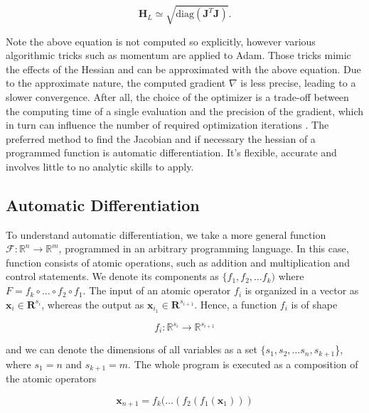 \documentclass{article}
\begin{document}
\begin{equation}
    \mathbf{H}_L \simeq \sqrt{\text{diag}(\mathbf{J}^T\mathbf{J})}.
\end{equation}

Note the above equation is not computed so explicitly, however various algorithmic tricks such as momentum are applied to Adam. Those tricks mimic the effects of the Hessian and can be approximated with the above equation. Due to the approximate nature, the computed gradient $\nabla$ is less precise, leading to a slower convergence. After all, the choice of the optimizer is a trade-off between the computing time of a single evaluation and the precision of the gradient, which in turn can influence the number of required optimization iterations \citep{bottou2007tradeoffs}. The preferred method to find the Jacobian and if necessary the hessian of a programmed function is automatic differentiation. It's flexible, accurate and involves little to no analytic skills to apply.

\subsection{Automatic Differentiation}
\label{ad}

To understand automatic differentiation, we take a more general function $\mathcal{F} \colon \mathbb{R}^n \rightarrow \mathbb{R}^m$, programmed in an arbitrary programming language. In this case, function consists of atomic operations, such as addition and multiplication and control statements. We denote its components as $\{f_1, f_2, \dots f_{k})$ where $F = f_{k} \circ \dots \circ f_2 \circ f_1$. The input of an atomic operator $f_i$ is organized in a vector as $\mathbf{x}_i \in \mathbf{R}^{s_i}$, whereas the output as $\mathbf{x}_{i_1} \in \mathbf{R}^{s_{i+1}}$. Hence, a function $f_i$ is of shape 

\begin{equation}
    f_i \colon \mathbb{R}^{s_i} \rightarrow \mathbb{R}^{s_{i+1}}
\end{equation}

and we can denote the dimensions of all variables as a set $\{s_1, s_2, \dots s_n, s_{k+1}$\}, where $s_1 = n$ and $s_{k+1} = m$. The whole program is executed as a composition of the atomic operators

\begin{equation}
    \mathbf{x}_{n+1} = f_k( \dots (f_2(f_1(\mathbf{x}_1)))
\end{equation} 
\end{document}
